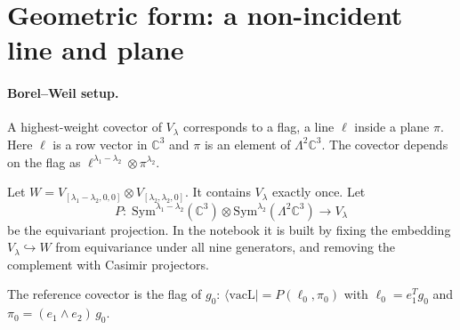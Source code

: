 \documentclass[11pt]{article}
\newcommand{\vacL}{\langle\mathrm{vacL}|}
\theoremstyle{definition}
\theoremstyle{remark}
\begin{document}
\section{Geometric form: a non-incident line and plane}\label{sec:bw}

\paragraph{Borel--Weil setup.}
A highest-weight covector of $V_\lambda$ corresponds to a flag, a line $\ell$ inside a plane $\pi$. Here $\ell$ is a row vector in $\mathbb C^3$ and $\pi$ is an element of $\Lambda^2\mathbb C^3$. The covector depends on the flag as $\ell^{\lambda_1-\lambda_2}\otimes\pi^{\lambda_2}$.

Let $W=V_{[\lambda_1-\lambda_2,0,0]}\otimes V_{[\lambda_2,\lambda_2,0]}$. It contains $V_\lambda$ exactly once. Let
\begin{equation}
P:\;\mathrm{Sym}^{\lambda_1-\lambda_2}(\mathbb C^3)\otimes\mathrm{Sym}^{\lambda_2}(\Lambda^2\mathbb C^3)\to V_\lambda
\end{equation}
be the equivariant projection. In the notebook it is built by fixing the embedding $V_\lambda\hookrightarrow W$ from equivariance under all nine generators, and removing the complement with Casimir projectors.

The reference covector is the flag of $g_0$: $\vacL=P(\ell_0,\pi_0)$ with $\ell_0=e_1^T g_0$ and $\pi_0=(e_1\wedge e_2)\,g_0$.
\end{document}
